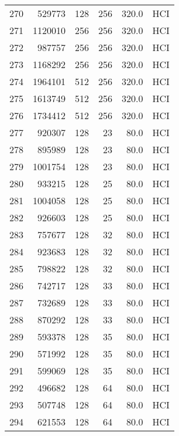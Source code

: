 \begin{longtable}{lrrrrl}
270 &    529773 &        128 &       256 &          320.0 &  HCI \\
271 &   1120010 &        256 &       256 &          320.0 &  HCI \\
272 &    987757 &        256 &       256 &          320.0 &  HCI \\
273 &   1168292 &        256 &       256 &          320.0 &  HCI \\
274 &   1964101 &        512 &       256 &          320.0 &  HCI \\
275 &   1613749 &        512 &       256 &          320.0 &  HCI \\
276 &   1734412 &        512 &       256 &          320.0 &  HCI \\
277 &    920307 &        128 &        23 &           80.0 &  HCI \\
278 &    895989 &        128 &        23 &           80.0 &  HCI \\
279 &   1001754 &        128 &        23 &           80.0 &  HCI \\
280 &    933215 &        128 &        25 &           80.0 &  HCI \\
281 &   1004058 &        128 &        25 &           80.0 &  HCI \\
282 &    926603 &        128 &        25 &           80.0 &  HCI \\
283 &    757677 &        128 &        32 &           80.0 &  HCI \\
284 &    923683 &        128 &        32 &           80.0 &  HCI \\
285 &    798822 &        128 &        32 &           80.0 &  HCI \\
286 &    742717 &        128 &        33 &           80.0 &  HCI \\
287 &    732689 &        128 &        33 &           80.0 &  HCI \\
288 &    870292 &        128 &        33 &           80.0 &  HCI \\
289 &    593378 &        128 &        35 &           80.0 &  HCI \\
290 &    571992 &        128 &        35 &           80.0 &  HCI \\
291 &    599069 &        128 &        35 &           80.0 &  HCI \\
292 &    496682 &        128 &        64 &           80.0 &  HCI \\
293 &    507748 &        128 &        64 &           80.0 &  HCI \\
294 &    621553 &        128 &        64 &           80.0 &  HCI \\

\end{longtable}
